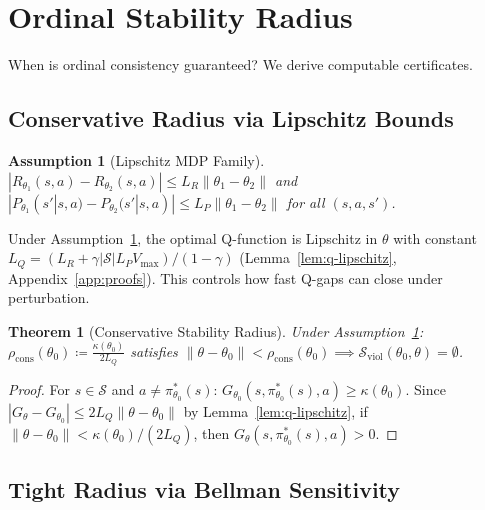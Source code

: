 \documentclass{article}
\newtheorem{theorem}{Theorem}
\newtheorem{assumption}{Assumption}
\newcommand{\cS}{\mathcal{S}}
\newcommand{\Sviol}{\mathcal{S}_{\mathrm{viol}}}
\newcommand{\Vmax}{V_{\max}}
\begin{document}
\section{Ordinal Stability Radius}
\label{sec:stability}

When is ordinal consistency guaranteed? We derive computable certificates.

\subsection{Conservative Radius via Lipschitz Bounds}

\begin{assumption}[Lipschitz MDP Family]
\label{asm:lipschitz}
$|R_{\theta_1}(s,a) - R_{\theta_2}(s,a)| \leq L_R\|\theta_1 - \theta_2\|$ and $|P_{\theta_1}(s'|s,a) - P_{\theta_2}(s'|s,a)| \leq L_P\|\theta_1 - \theta_2\|$ for all $(s,a,s')$.
\end{assumption}

Under Assumption~\ref{asm:lipschitz}, the optimal Q-function is Lipschitz in $\theta$ with constant $L_Q = (L_R + \gamma|\cS|L_P\Vmax)/(1-\gamma)$ (Lemma~\ref{lem:q-lipschitz}, Appendix~\ref{app:proofs}). This controls how fast Q-gaps can close under perturbation.

\begin{theorem}[Conservative Stability Radius]
\label{thm:stability-radius}
Under Assumption~\ref{asm:lipschitz}: $\rho_{\mathrm{cons}}(\theta_0) \coloneqq \frac{\kappa(\theta_0)}{2L_Q}$ satisfies $\|\theta - \theta_0\| < \rho_{\mathrm{cons}}(\theta_0) \implies \Sviol(\theta_0, \theta) = \emptyset$.
\end{theorem}
\begin{proof}
For $s \in \cS$ and $a \neq \pi^*_{\theta_0}(s)$: $G_{\theta_0}(s,\pi^*_{\theta_0}(s),a) \geq \kappa(\theta_0)$. Since $|G_\theta - G_{\theta_0}| \leq 2L_Q\|\theta - \theta_0\|$ by Lemma~\ref{lem:q-lipschitz}, if $\|\theta-\theta_0\| < \kappa(\theta_0)/(2L_Q)$, then $G_\theta(s,\pi^*_{\theta_0}(s),a) > 0$.
\end{proof}

\subsection{Tight Radius via Bellman Sensitivity}
\end{document}
